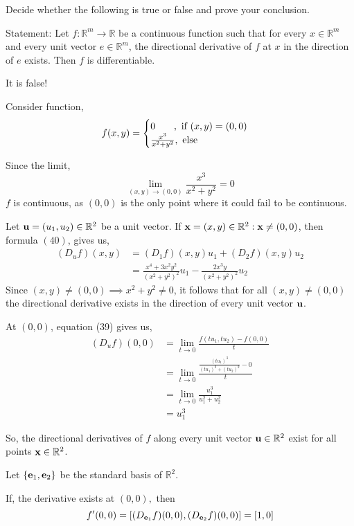 \documentclass{article}
\newcommand\R{\mathbb{R}}
\begin{document}
Decide whether the following is true or false and prove your
conclusion.

Statement: Let $f:\R^m \rightarrow \R$  be a continuous function such
that for every $x\in\R^m$ and every unit vector $e\in \R^m$, the
directional derivative of $f$ at $x$ in the direction of $e$
exists. Then $f$ is differentiable.


It is false!

Consider function,
\[f(x,y) = \begin{cases} 0\hspace{1.91em},\text{ if } (x,y) = (0,0)\\
    \frac{x^3}{x^2+y^2},\text{ else}\end{cases}\]

Since the limit,\[\lim_{(x,y)\rightarrow (0,0)} \frac{x^3}{x^2+y^2} =
  0\]
$f$ is continuous, as $(0,0)$ is the only point where it could fail to
be continuous.

Let $\vb{u} = (u_1,u_2)\in \R^2$ be a unit vector. If $\vb{x} = (x,y)\in \R^2: \vb{x}\neq
(0,0)$, then formula $(40)$, gives us,
\begin{align*}
  (D_u f)(x,y) &= (D_1 f)(x,y)u_1 + (D_2 f)(x,y)u_2\\
               &= \frac{x^4+3x^2y^2}{(x^2+y^2)^2}u_1 - \frac{2x^3y}{(x^2+y^2)^2}u_2
\end{align*}
Since $(x,y)\neq (0,0) \implies x^2+y^2\neq 0$, it follows that for
all $(x,y)\neq (0,0)$ the directional derivative exists in the
direction of every unit vector $\vb{u}$.

At $(0,0)$, equation (39) gives us,
\begin{align*}
  (D_u f)(0,0) &= \lim_{t\rightarrow 0} \frac{f(tu_1,tu_2) -
                 f(0,0)}{t}\\
               &= \lim_{t\rightarrow 0} \frac{\frac{(tu_1)^3}{(tu_1)^2+(tu_2)^2} - 0
                 }{t}\\
               &= \lim_{t\rightarrow 0} \frac{u_1^3}{u_1^2+u_2^2}\\
               &= u_1^3
\end{align*}

So, the directional derivatives of $f$ along every unit vector
$\vb{u}\in\R^2$ exist for all points $\vb{x}\in \R^2$.

Let $\{\vb{e}_1,\vb{e}_2\}$ be the standard basis of $\R^2$.

If, the derivative exists at $(0,0),$ then \[f'(0,0) = [(D_{\vb{e}_1}
  f)(0,0),(D_{\vb{e}_2} f)(0,0)] = [1,0]\]
\end{document}
